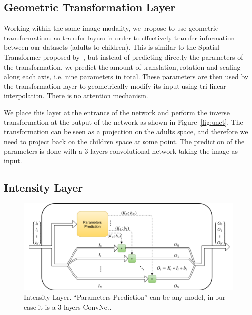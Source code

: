 \subsection{Geometric Transformation Layer}
\label{ssec:geo_transfo}

Working within the same image modality, we propose to use geometric transformations as transfer layers in order to effectively transfer information between our datasets (adults to children). This is similar to the Spatial Transformer proposed by~\textcite{jaderberg2015NIPS}, but instead of predicting directly the parameters of the transformation, we predict the amount of translation, rotation and scaling along each axis, i.e. nine parameters in total. These parameters are then used by the transformation layer to geometrically modify its input using tri-linear interpolation. There is no attention mechanism.

We place this layer at the entrance of the network and perform the inverse transformation at the output of the network as shown in Figure~\ref{fig:unet}. The transformation can be seen as a projection on the adults space, and therefore we need to project back on the children space at some point. The prediction of the parameters is done with a 3-layers convolutional network taking the image as input.

\subsection{Intensity Layer}
\label{ssec:intensity_transfo}

\begin{figure}[htb]
	\includegraphics[width=\textwidth]{img_transfer/Intensity_Block}
    \caption{Intensity Layer. ``Parameters Prediction'' can be any model, in our case it is a 3-layers ConvNet.}
    \label{fig:block}
\end{figure}

